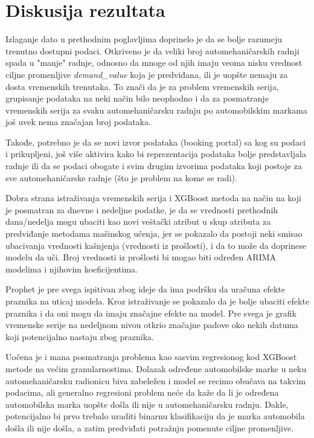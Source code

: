 \documentclass[12pt,oneside]{memoir}
\begin{document}
\section{Diskusija rezultata}
Izlaganje dato u prethodnim poglavljima doprinelo je da se bolje razumeju trenutno dostupni podaci. Otkriveno je da veliki broj automehaničarskih radnji spada u "manje" radnje, odnosno da mnoge od njih imaju veoma nisku vrednost ciljne promenljive \textit{demand\_value} koja je predviđana, ili je uopšte nemaju za dosta vremenskih trenutaka. To znači da je za problem vremenskih serija, grupisanje podataka na neki način bilo neophodno i da za posmatranje vremenskih serija za svaku automehaničarsku radnju po automobilskim markama još uvek nema značajan broj podataka.

Takođe, potrebno je da se novi izvor podataka (booking portal) sa kog su podaci i prikupljeni, još više aktivira kako bi reprezentacija podataka bolje predstavljala radnje ili da se podaci obogate i svim drugim izvorima podataka koji postoje za sve automehaničarske radnje (što je problem na kome se radi).

Dobra strana istraživanja vremenskih serija i XGBoost metoda na način na koji je posmatran za dnevne i nedeljne podatke, je da se vrednosti prethodnih dana/nedelja mogu ubaciti kao novi veštački atribut u skup atributa za predviđanje metodama mašinskog učenja, jer se pokazalo da postoji neki smisao ubacivanja vrednosti kašnjenja (vrednosti iz prošlosti), i da to može da doprinese modelu da uči. Broj vrednosti iz prošlosti bi mogao biti određen ARIMA modelima i njihovim koeficijentima.

Prophet je pre svega ispitivan zbog ideje da ima podršku da uračuna efekte praznika na uticaj modela. Kroz istraživanje se pokazalo da je bolje ubaciti efekte praznika i da oni mogu da imaju značajne efekte na model. Pre svega je grafik vremenske serije na nedeljnom nivou otkrio značajne padove oko nekih datuma koji potencijalno nastaju zbog praznika.

Uočena je i mana posmatranja problema kao sasvim regresionog kod XGBoost metode na većim granularnostima. Dolazak određene automobilske marke u neku automehaničarsku radionicu biva zabeležen i model se recimo obučava na takvim podacima, ali generalno regresioni problem neće da kaže da li je određena automobilska marka uopšte došla ili nije u automehaničarsku radnju. Dakle, potencijalno bi prvo trebalo uraditi binarnu klasifikaciju da je marka automobila došla ili nije došla, a zatim predviđati potražnju pomenute ciljne promenljive.
\end{document}

